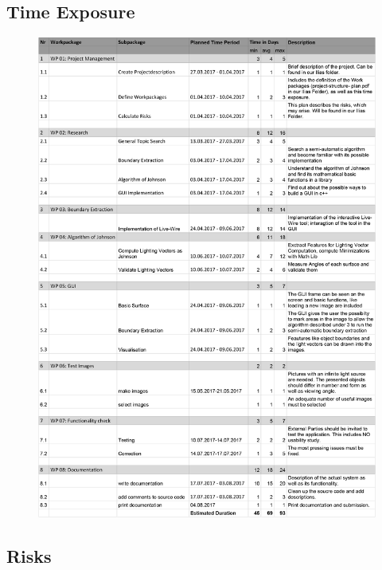 \subsection{Time Exposure} \label{sec:timeExposure}

\begin{figure}[H] 
	\center 
	\includegraphics[width = \linewidth]{Images/Project Description and Time Exposure.jpg}		
\end{figure}



\subsection{Risks} \label{sec:risks}

